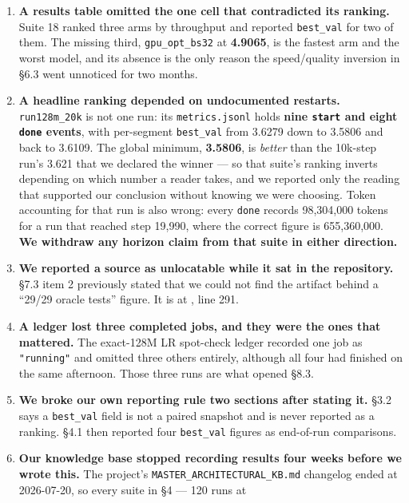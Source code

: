\begin{enumerate}
\def\labelenumi{\arabic{enumi}.}
\item
  \textbf{A results table omitted the one cell that contradicted its ranking.} Suite 18 ranked three
  arms by throughput and reported \texttt{best\_val} for two of them. The missing third,
  \texttt{gpu\_opt\_bs32} at \textbf{4.9065}, is the fastest arm and the worst model, and its absence is the
  only reason the speed/quality inversion in \S6.3 went unnoticed for two months.
\item
  \textbf{A headline ranking depended on undocumented restarts.} \texttt{run128m\_20k} is not one run: its
  \texttt{metrics.jsonl} holds \textbf{nine \texttt{start} and eight \texttt{done} events}, with per-segment \texttt{best\_val}
  from 3.6279 down to 3.5806 and back to 3.6109. The global minimum, \textbf{3.5806}, is \emph{better} than
  the 10k-step run's 3.621 that we declared the winner --- so that suite's ranking inverts
  depending on which number a reader takes, and we reported only the reading that supported our
  conclusion without knowing we were choosing. Token accounting for that run is also wrong: every
  \texttt{done} records 98,304,000 tokens for a run that reached step 19,990, where the correct figure is
  655,360,000. \textbf{We withdraw any horizon claim from that suite in either direction.}
\item
  \textbf{We reported a source as unlocatable while it sat in the repository.} \S7.3 item 2 previously
  stated that we could not find the artifact behind a ``29/29 oracle tests'' figure. It is at
  , line 291.
\item
  \textbf{A ledger lost three completed jobs, and they were the ones that mattered.} The exact-128M
  LR spot-check ledger recorded one job as \texttt{"running"} and omitted three others entirely, although
  all four had finished on the same afternoon. Those three runs are what opened \S8.3.
\item
  \textbf{We broke our own reporting rule two sections after stating it.} \S3.2 says a \texttt{best\_val} field
  is not a paired snapshot and is never reported as a ranking. \S4.1 then reported four \texttt{best\_val}
  figures as end-of-run comparisons.
\item
  \textbf{Our knowledge base stopped recording results four weeks before we wrote this.} The project's
  \texttt{MASTER\_ARCHITECTURAL\_KB.md} changelog ended at 2026-07-20, so every suite in \S4 --- 120 runs at

\end{enumerate}
